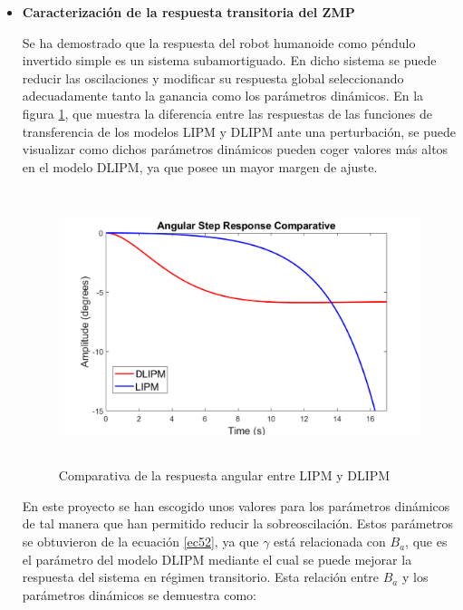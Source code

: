 \begin{itemize}
\item \textbf{Caracterización de la respuesta transitoria del ZMP}

Se ha demostrado que la respuesta del robot humanoide como péndulo invertido simple es un sistema subamortiguado. En dicho sistema se puede reducir las oscilaciones y modificar su respuesta global seleccionando adecuadamente tanto la ganancia como los parámetros dinámicos. En la figura \ref{figura58}, que muestra la diferencia entre las respuestas de las funciones de transferencia de los modelos LIPM y DLIPM ante una perturbación, se puede visualizar como dichos parámetros dinámicos pueden coger valores más altos en el modelo DLIPM, ya que posee un mayor margen de ajuste. 

\begin{figure}[H]
\centering
\includegraphics[width=13cm, height=8cm]{imagenes/apartado_5/59_comparativa_paso}
\caption{Comparativa de la respuesta angular entre LIPM y DLIPM}
\label{figura58}
\end{figure}

En este proyecto se han escogido unos valores para los parámetros dinámicos de tal manera que han permitido reducir la sobreoscilación. Estos parámetros se obtuvieron de la ecuación \ref{ec52}, ya que $\gamma$ está relacionada con $B_a$, que es el parámetro del modelo DLIPM mediante el cual se puede mejorar la respuesta del sistema en régimen transitorio. Esta relación entre $B_a$ y los parámetros dinámicos se demuestra como:



\end{itemize}



